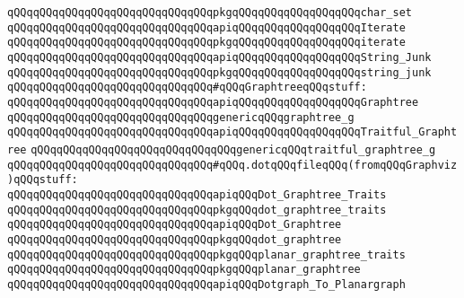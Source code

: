 \verb|qQQqqQQqqQQqqQQqqQQqqQQqqQQqqQQqpkgqQQqqQQqqQQqqQQqqQQqchar_set|\newline
\newline
\verb|qQQqqQQqqQQqqQQqqQQqqQQqqQQqqQQqapiqQQqqQQqqQQqqQQqqQQqIterate|\newline
\verb|qQQqqQQqqQQqqQQqqQQqqQQqqQQqqQQqpkgqQQqqQQqqQQqqQQqqQQqiterate|\newline
\newline
\verb|qQQqqQQqqQQqqQQqqQQqqQQqqQQqqQQqapiqQQqqQQqqQQqqQQqqQQqString_Junk|\newline
\verb|qQQqqQQqqQQqqQQqqQQqqQQqqQQqqQQqpkgqQQqqQQqqQQqqQQqqQQqstring_junk|\newline
\newline
\verb|qQQqqQQqqQQqqQQqqQQqqQQqqQQqqQQq#qQQqGraphtreeqQQqstuff:|\newline
\newline
\verb|qQQqqQQqqQQqqQQqqQQqqQQqqQQqqQQqapiqQQqqQQqqQQqqQQqqQQqGraphtree|\newline
\verb|qQQqqQQqqQQqqQQqqQQqqQQqqQQqqQQqgenericqQQqgraphtree_g|\newline
\newline
\verb|qQQqqQQqqQQqqQQqqQQqqQQqqQQqqQQqapiqQQqqQQqqQQqqQQqqQQqTraitful_Graphtree|\newline
\verb|qQQqqQQqqQQqqQQqqQQqqQQqqQQqqQQqgenericqQQqtraitful_graphtree_g|\newline
\newline
\newline
\newline
\verb|qQQqqQQqqQQqqQQqqQQqqQQqqQQqqQQq#qQQq.dotqQQqfileqQQq(fromqQQqGraphviz)qQQqstuff:|\newline
\newline
\verb|qQQqqQQqqQQqqQQqqQQqqQQqqQQqqQQqapiqQQqDot_Graphtree_Traits|\newline
\verb|qQQqqQQqqQQqqQQqqQQqqQQqqQQqqQQqpkgqQQqdot_graphtree_traits|\newline
\newline
\verb|qQQqqQQqqQQqqQQqqQQqqQQqqQQqqQQqapiqQQqDot_Graphtree|\newline
\verb|qQQqqQQqqQQqqQQqqQQqqQQqqQQqqQQqpkgqQQqdot_graphtree|\newline
\newline
\verb|qQQqqQQqqQQqqQQqqQQqqQQqqQQqqQQqpkgqQQqplanar_graphtree_traits|\newline
\verb|qQQqqQQqqQQqqQQqqQQqqQQqqQQqqQQqpkgqQQqplanar_graphtree|\newline
\newline
\verb|qQQqqQQqqQQqqQQqqQQqqQQqqQQqqQQqapiqQQqDotgraph_To_Planargraph|\newline
